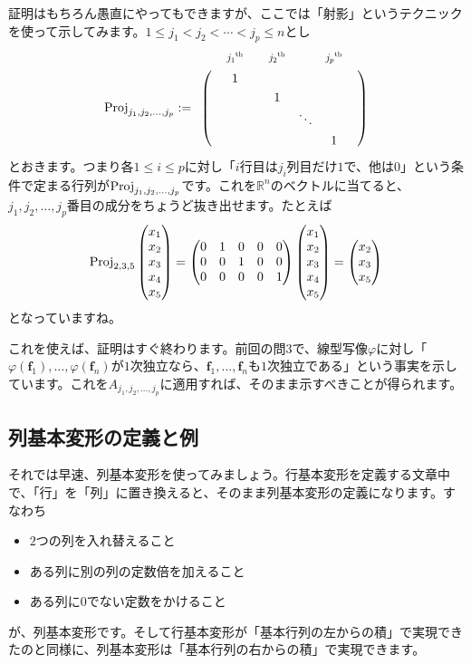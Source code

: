証明はもちろん愚直にやってもできますが、ここでは「射影」というテクニックを使って示してみます。$1\leq j_1 < j_2 < \cdots < j_p \leq n$とし
\begin{align*}
\Proj_{j_1, j_2, \ldots, j_p} :=
\bordermatrix{
 & & \scalebox{0.8}{${j_1}^{\text{th}}$} &  & \scalebox{0.8}{${j_2}^{\text{th}}$} &  & \scalebox{0.8}{${j_p}^{\text{th}}$} \cr
 & & 1 &  &  \cr
 & &  &  & 1 \cr
 & & & & & \ddots \cr
 & & & & & & 1 &
}
\end{align*}
とおきます。つまり各$1\leq i \leq p$に対し「$i$行目は$j_i$列目だけ$1$で、他は$0$」という条件で定まる行列が$\operatorname{Proj}_{j_1, j_2, \ldots, j_p}$です。これを$\mathbb{R}^n$のベクトルに当てると、$j_1, j_2, \ldots, j_p$番目の成分をちょうど抜き出せます。たとえば
\[
\operatorname{Proj}_{2, 3, 5}
\begin{pmatrix}
x_1 \\
x_2 \\
x_3 \\
x_4 \\
x_5
\end{pmatrix}
=
\begin{pmatrix}
0 & 1 & 0 & 0 & 0 \\
0 & 0 & 1 & 0 & 0 \\
0 & 0 & 0 & 0 & 1
\end{pmatrix}
\begin{pmatrix}
x_1 \\
x_2 \\
x_3 \\
x_4 \\
x_5
\end{pmatrix}
=
\begin{pmatrix}
x_2 \\
x_3 \\
x_5
\end{pmatrix}
\]
となっていますね。

これを使えば、証明はすぐ終わります。前回の問$3$で、線型写像$\varphi$に対し「$\varphi(\bm{f}_1), \ldots, \varphi(\bm{f}_n)$が$1$次独立なら、$\bm{f}_1, \ldots, \bm{f}_n$も$1$次独立である」という事実を示しています。これを$A_{j_1, j_2, \ldots, j_p}$に適用すれば、そのまま示すべきことが得られます。

\subsection{列基本変形の定義と例}

それでは早速、列基本変形を使ってみましょう。行基本変形を定義する文章中で、「行」を「列」に置き換えると、そのまま列基本変形の定義になります。すなわち
\begin{itemize}
\item $2$つの列を入れ替えること
\item ある列に別の列の定数倍を加えること
\item ある列に$0$でない定数をかけること
\end{itemize}
が、列基本変形です。そして行基本変形が「基本行列の左からの積」で実現できたのと同様に、列基本変形は「基本行列の右からの積」で実現できます。

